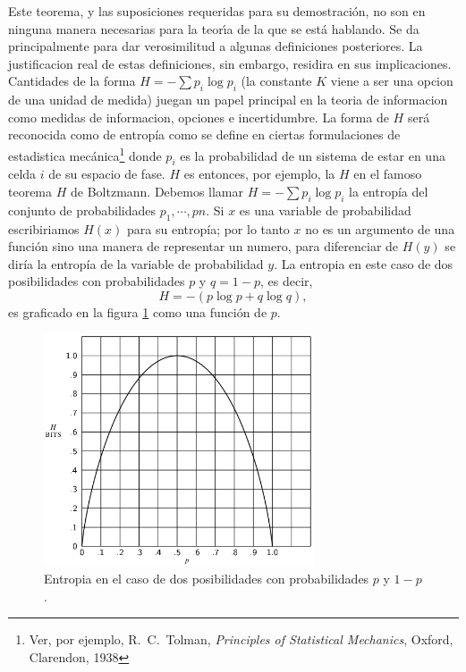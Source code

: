Este teorema, y las suposiciones requeridas para su demostraci\'{o}n,
no son en ninguna manera necesarias para la teor\'{\i}a de la que se
est\'{a} hablando.  Se da principalmente para dar verosimilitud a
algunas definiciones posteriores. La justificacion real de estas
definiciones, sin embargo, residira en sus implicaciones. Cantidades
de la forma $H = -\sum p_{i} \log p_{i}$ (la constante $K$ viene a ser una
opcion de una unidad de medida) juegan un papel principal en la teoria
de informacion como medidas de informacion, opciones e
incertidumbre. La forma de $H$ ser\'{a} reconocida como de
entrop\'{i}a como se define en ciertas formulaciones de estadistica
mec\'{a}nica\footnote{Ver, por ejemplo, R.\ C.\ Tolman, {\em
    Principles of Statistical Mechanics}, Oxford, Clarendon, 1938}
donde $p_{i}$ es la probabilidad de un sistema de estar en una celda
$i$ de su espacio de fase. $H$ es entonces, por ejemplo, la $H$ en el
famoso teorema $H$ de Boltzmann. Debemos llamar $H = -\sum p_{i}
\log{p_{i}}$ la entrop\'{i}a del conjunto de probabilidades $p_{1},
\cdots,p{n}$. Si $x$ es una variable de probabilidad escribiriamos
$H(x)$ para su entrop\'{i}a; por lo tanto $x$ no es un argumento de
una funci\'{o}n sino una manera de representar un numero, para
diferenciar de $H(y)$ se dir\'{i}a la entrop\'{i}a de la variable de
probabilidad $y$.  La entropia en este caso de dos posibilidades con
probabilidades $p$ y $q = 1 - p$, es decir,
\begin{equation}
H = -(p \log p + q \log q),
\end{equation}
es graficado en la figura \ref{fig:7} como una funci\'{o}n de $p$.

\begin{figure}[!ht]
\centerline{\includegraphics[width=80mm]{Imagenes/SinComentarios/Pagina11-Figura7.png}}
\caption{Entropia en el caso de dos posibilidades con probabilidades
  $p$ y $1 - p$.}
\label{fig:7}
\end{figure}

